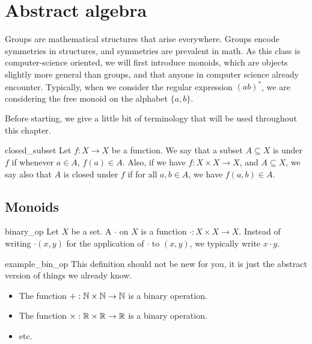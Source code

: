 \section{Abstract algebra}

Groups are mathematical structures that arise everywhere. Groups encode symmetries in structures, and symmetries are prevalent in math. As this class is computer-science oriented, we will first introduce monoids, which are objects slightly more general than groups, and that anyone in computer science already encounter. Typically, when we consider the regular expression \( (ab)^* \), we are considering the free monoid on the alphabet \( \{ a, b \} \). 

Before starting, we give a little bit of terminology that will be used throughout this chapter.
\begin{cdef}{}{closed_subset}
    Let \( f : X \to X \) be a function. We say that a subset \( A \subseteq X \) is  under \( f \) if whenever \( a \in A \), \( f(a) \in A \). Also, if we have \( f : X\times X \to X \), and \( A \subseteq X \), we say also that \( A \) is closed under \( f \) if for all \( a, b \in  A \), we have \( f(a, b) \in A \). 
\end{cdef}

\subsection{Monoids}

\begin{cdef}{}{binary_op}
    Let \( X \) be a set. A  \( \cdot \) on \( X \) is a function \( \cdot : X \times X \to X \). Instead of writing \( \cdot(x, y) \) for the application of \( \cdot \) to \( (x, y) \), we typically write \( x \cdot y \).
\end{cdef}

\begin{cexp}{}{example_bin_op}
    This definition should not be new for you, it is just the abstract version of things we already know. 
    \begin{itemize}
        \item The function \( + : \mathbb{N} \times \mathbb{N} \to \mathbb{N} \) is a binary operation.
        \item The function \( \times : \mathbb{R} \times \mathbb{R} \to \mathbb{R} \) is a binary operation.
        \item etc.
    \end{itemize}
\end{cexp}

